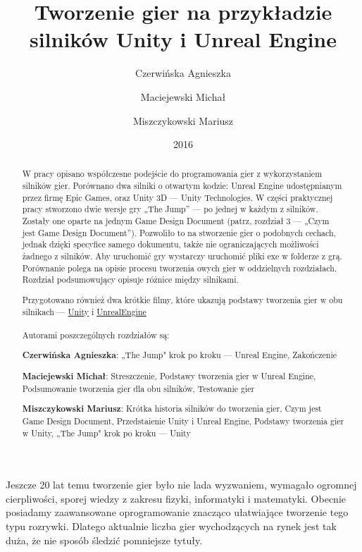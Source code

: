 \documentclass[openright]{xmgr}
\author   {Czerwińska Agnieszka}
\author   {Maciejewski Michał}
\author   {Miszczykowski Mariusz}
\title    {Tworzenie gier na przykładzie silników Unity i Unreal Engine}
\date     {2016}
\begin{document}
\begin{abstract}
W pracy opisano współczesne podejście do programowania gier z wykorzystaniem silników gier. Porównano dwa silniki o otwartym kodzie: Unreal Engine udostępnianym przez firmę Epic Games, oraz Unity 3D — Unity Technologies. W części praktycznej pracy stworzono dwie wersje gry
„The Jump” — po jednej w każdym z silników. Zostały one oparte na jednym Game Design Document (patrz, rozdział 3 — „Czym jest Game Design Document”). Pozwoliło to na stworzenie gier o podobnych cechach, jednak dzięki specyfice samego dokumentu, także nie ograniczających możliwości żadnego z silników. Aby uruchomić gry wystarczy uruchomić pliki exe w folderze z grą. Porównanie polega na opisie procesu tworzenia owych gier w oddzielnych rozdziałach. Rozdział podsumowujący opisuje różnice między silnikami.

Przygotowano również dwa krótkie filmy, które ukazują podstawy tworzenia gier w obu silnikach — \href{https://www.youtube.com/watch?v=phQOiSH_uXU}{Unity} i \href{https://www.youtube.com/watch?v=V53ZVRSyOgc}{UnrealEngine}
\\
\\ 
Autorami poszczególnych rozdziałów są:

\textbf{Czerwińska Agnieszka}: „The Jump" krok po kroku — Unreal Engine, Zakończenie

\textbf{Maciejewski Michał}: Streszczenie, Podstawy tworzenia gier w Unreal Engine, Podsumowanie tworzenia gier dla obu silników, Testowanie gier

\textbf{Miszczykowski Mariusz}: Krótka historia silników do tworzenia gier, Czym jest Game Design Document, Przedstaienie Unity i Unreal Engine, Podstawy tworzenia gier w Unity, „The Jump" krok po kroku — Unity

\end{abstract}



\maketitle

\introduction

Jeszcze 20 lat temu tworzenie gier było nie lada wyzwaniem, wymagało ogromnej cierpliwości, sporej wiedzy z zakresu fizyki, informatyki i matematyki. Obecnie posiadamy zaawansowane oprogramowanie znacząco ułatwiające tworzenie tego typu rozrywki. Dlatego aktualnie liczba gier wychodzących na rynek jest tak duża, że nie sposób śledzić pomniejsze tytuły.
\end{document}
